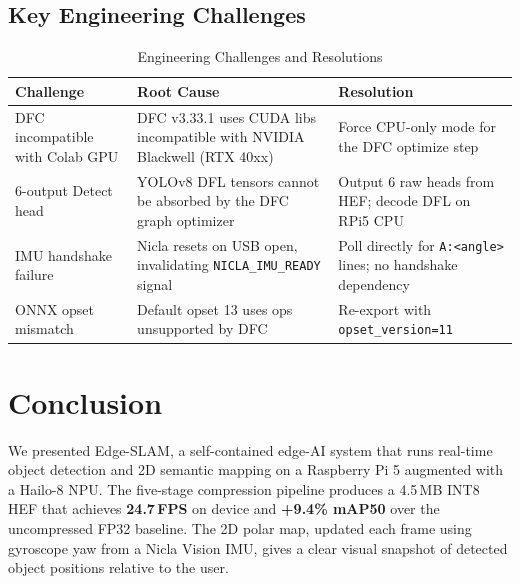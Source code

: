 \documentclass[journal, onecolumn]{IEEEtran}
\begin{document}
\subsection{Key Engineering Challenges}

\begin{table}[H]
\centering
\caption{Engineering Challenges and Resolutions}
\label{tab:challenges}
\begin{tabularx}{\textwidth}{lXX}
\toprule
\textbf{Challenge} & \textbf{Root Cause} & \textbf{Resolution} \\
\midrule
DFC incompatible with Colab GPU & DFC v3.33.1 uses CUDA libs incompatible with NVIDIA Blackwell (RTX 40xx) & Force CPU-only mode for the DFC optimize step \\
6-output Detect head & YOLOv8 DFL tensors cannot be absorbed by the DFC graph optimizer & Output 6 raw heads from HEF; decode DFL on RPi5 CPU \\
IMU handshake failure & Nicla resets on USB open, invalidating \texttt{NICLA\_IMU\_READY} signal & Poll directly for \texttt{A:<angle>} lines; no handshake dependency \\
ONNX opset mismatch & Default opset 13 uses ops unsupported by DFC & Re-export with \texttt{opset\_version=11} \\
\bottomrule
\end{tabularx}
\end{table}

\section{Conclusion}
\label{sec:concl}

We presented Edge-SLAM, a self-contained edge-AI system that runs real-time object detection and 2D semantic mapping on a Raspberry Pi 5 augmented with a Hailo-8 NPU. The five-stage compression pipeline produces a 4.5\,MB INT8 HEF that achieves \textbf{24.7\,FPS} on device and \textbf{+9.4\% mAP50} over the uncompressed FP32 baseline. The 2D polar map, updated each frame using gyroscope yaw from a Nicla Vision IMU, gives a clear visual snapshot of detected object positions relative to the user.
\end{document}

